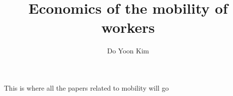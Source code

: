 \documentclass{article}
\title{Economics of the mobility of workers}
\author{Do Yoon Kim}
\begin{document}
\maketitle
This is where all the papers related to mobility will go 
\end{document}
